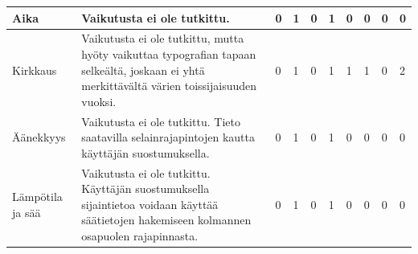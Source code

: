 \documentclass[finnish, 12pt, a4paper, elec, utf8, a-1b, online]{aaltothesis}
\begin{document}
{\begin{longtable}{p{2.5cm}|p{6cm}|p{0.5cm}p{0.5cm}p{0.5cm}|p{0.5cm}|p{0.5cm}p{0.5cm}p{0.5cm}|p{0.5cm}|}
        \midrule
        Aika                                   & Vaikutusta ei ole tutkittu.                                                                                                                                                                                                                                                                                              & 0                                          & 1                                   & 0                                      & 1                            & 0                                               & 0                                         & 0                                         & 0                            \\
        \midrule
        Kirkkaus                               & Vaikutusta ei ole tutkittu, mutta hyöty vaikuttaa typografian tapaan selkeältä, joskaan ei yhtä merkittävältä värien toissijaisuuden vuoksi.                                                                                                                                                                             & 0                                          & 1                                   & 0                                      & 1                            & 1                                               & 1                                         & 0                                         & 2                            \\
        \midrule
        Äänekkyys                              & Vaikutusta ei ole tutkittu. Tieto saatavilla selainrajapintojen kautta käyttäjän suostumuksella.                                                                                                                                                                                                                         & 0                                          & 1                                   & 0                                      & 1                            & 0                                               & 0                                         & 0                                         & 0                            \\
        \midrule
        Lämpötila ja sää                       & Vaikutusta ei ole tutkittu. Käyttäjän suostumuksella sijaintietoa voidaan käyttää säätietojen hakemiseen kolmannen osapuolen rajapinnasta.                                                                                                                                                                               & 0                                          & 1                                   & 0                                      & 1                            & 0                                               & 0                                         & 0                                         & 0                            \\

\end{longtable}}
\end{document}
